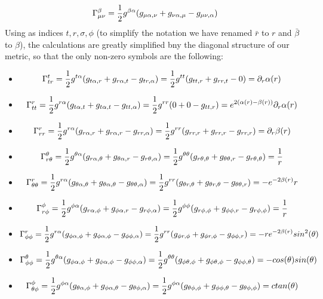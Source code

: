 \documentclass[]{article}
\theoremstyle{definition}
\theoremstyle{Theorem}
\theoremstyle{definition}
\theoremstyle{definition}
\theoremstyle{definition}
\begin{document}
$$\Gamma_{\mu\nu}^\beta={1\over 2}g^{\beta\alpha}(g_{\mu\alpha,\nu}+g_{\nu\alpha,\mu}-g_{\mu\nu,\alpha})$$
Using as indices ${t,r,\sigma,\phi}$ (to simplify the notation we have renamed $\bar{r}$ to $r$ and $\bar{\beta}$ to $\beta$), the calculations are greatly simplified bny the diagonal structure of our metric, so that the only non-zero symbols are the following:\\
\begin{itemize}
	\item $$\Gamma_{tr}^t={1\over 2}g^{t\alpha}(g_{t\alpha,r}+g_{r\alpha,t}-g_{tr,\alpha})={1\over 2}g^{tt}(g_{tt,r}+g_{rr,t}-0)=\partial_r\alpha(r)$$
	\item $$\Gamma_{tt}^r={1\over 2}g^{r\alpha}(g_{t\alpha,t}+g_{t\alpha,t}-g_{tt,\alpha})={1\over 2}g^{rr}(0+0-g_{tt,r})=e^{2(\alpha(r)-\beta(r))}\partial_r\alpha(r)$$
	\item $$\Gamma_{rr}^r={1\over 2}g^{r\alpha}(g_{r\alpha,r}+g_{r\alpha,r}-g_{rr,\alpha})={1\over 2}g^{rr}(g_{rr,r}+g_{rr,r}-g_{rr,r})=\partial_r\beta(r)$$
	\item $$\Gamma_{r\theta}^\theta={1\over 2}g^{\theta\alpha}(g_{r\alpha,\theta}+g_{\theta\alpha,r}-g_{r\theta,\alpha})={1\over 2}g^{\theta\theta}(g_{r\theta,\theta}+g_{\theta\theta,r}-g_{r\theta,\theta})={1\over r}$$
	\item $$\Gamma_{\theta\theta}^r={1\over 2}g^{r\alpha}(g_{\theta\alpha,\theta}+g_{\theta\alpha,\theta}-g_{\theta\theta,\alpha})={1\over 2}g^{rr}(g_{\theta r,\theta}+g_{\theta r,\theta}-g_{\theta\theta,r})=-e^{-2\beta(r)}r$$
	\item $$\Gamma_{r\phi}^\phi={1\over 2}g^{\phi\alpha}(g_{r\alpha,\phi}+g_{\phi\alpha,r}-g_{r\phi,\alpha})={1\over 2}g^{\phi\phi}(g_{r\phi,\phi}+g_{\phi\phi,r}-g_{r\phi,\phi})={1\over r}$$
	\item $$\Gamma_{\phi\phi}^r={1\over 2}g^{r\alpha}(g_{\phi\alpha,\phi}+g_{\phi\alpha,\phi}-g_{\phi\phi,\alpha})={1\over 2}g^{rr}(g_{\phi r,\phi}+g_{\phi r,\phi}-g_{\phi\phi,r})=-re^{-2\beta(r)}sin^2(\theta)$$
	\item $$\Gamma_{\phi\phi}^\theta={1\over 2}g^{\theta\alpha}(g_{\phi\alpha,\phi}+g_{\phi\alpha,\phi}-g_{\phi\phi,\alpha})={1\over 2}g^{\theta\theta}(g_{\phi\theta,\phi}+g_{\phi\theta,\phi}-g_{\phi\phi,\theta})=-cos(\theta)sin(\theta)$$
	\item $$\Gamma_{\theta\phi}^\phi={1\over 2}g^{\phi\alpha}(g_{\theta\alpha,\phi}+g_{\phi\alpha,\theta}-g_{\theta\phi,\alpha})={1\over 2}g^{\phi\alpha}(g_{\theta\phi,\phi}+g_{\phi\phi,\theta}-g_{\theta\phi,\phi})=ctan(\theta)$$
\end{itemize}
\end{document}
